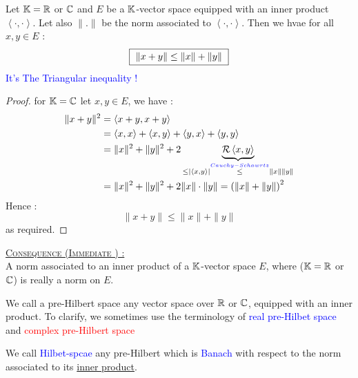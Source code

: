 \begin{corollary}
  Let $\mathbb{K} = \mathbb{R} $  or $\mathbb{C}  $ and $E $ be a $\mathbb{K} $-vector space equipped
  with an inner product $\left\langle \cdot ,\cdot  \right\rangle  $. Let 
  also $\| . \|  $  be the norm associated to $\left\langle \cdot , \cdot  \right\rangle  $. 
  Then we hvae for all $x,y \in  E $ :
  \[
    \fbox{
    $\| x + y \|  \leq \| x \| + \| y \|$
    }
  \]
  \textcolor{blue}{
  It's The Triangular inequality !
  }
\end{corollary}
\begin{proof}
for $\mathbb{K} = \mathbb{C}  $ let $x,y \in  E $, we have :
\begin{align*}
  \| x+y \| ^2  &= \left\langle x + y, x + y \right\rangle  \\
                &= \left\langle x, x \right\rangle  + 
                \left\langle x, y \right\rangle + \left\langle y,x \right\rangle  + 
                \left\langle y, y \right\rangle  \\
                &= \| x \| ^2  + \| y \| ^2 + 2 \underbrace{
                \mathcal{R} \left\langle x,y \right\rangle  
                }_{ \leq \left| \left\langle x,y \right\rangle  \right| \overset{
                    \textcolor{blue}{Cauchy-Schawrtz}
                  }{ \leq } 
                \| x \| \| y \| }  
                \\
                &= \| x \| ^2  + \| y \| ^2 + 
                2 \| x \|  \cdot  \| y \| 
                = \left( \| x \| + \| y \|   \right)^2 
\end{align*}
Hence : 
\[
\| x + y \|  \leq \| x \| + \| y \| 
\]
as required.
\end{proof}
\textsc{ \large \underline{Consequence (Immediate ) : \warning}}\\ 
A norm associated to an inner product of a $\mathbb{K} $-vector space $E$, where 
($\mathbb{K} = \mathbb{R}  $ or $\mathbb{C}  $) is really a norm on $E$. 
\divider
\begin{definition}[]
We call a pre-Hilbert space any vector space over $\mathbb{R} $ or $\mathbb{C}  $, equipped 
with an inner product. To clarify, we sometimes use the terminology of
\textcolor{blue}{real pre-Hilbet space} and \textcolor{red}{complex pre-Hilbert space}
\end{definition}
\begin{definition}[]
  We call 
  \textcolor{blue}{
    Hilbet-spcae
  } any pre-Hilbert which is 
  \textcolor{blue}{Banach} with respect to the norm associated to its 
  \underline{inner product}.
\end{definition}
